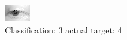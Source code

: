 \begin{figure}[h!]
\begin{center}
\includegraphics[width=0.60\columnwidth]{figures/ID2718_class_3_target_4.png}
\end{center}
\caption{ Classification: 3 actual target: 4}
\label{fig:ID2718_class_3_target_4}
\end{figure}
